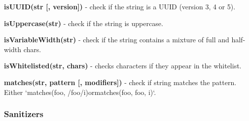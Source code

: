 \begin{DoxyItemize}
\item {\bfseries is\+U\+U\+I\+D(str \mbox{[}, version\mbox{]})} -\/ check if the string is a U\+U\+ID (version 3, 4 or 5).
\item {\bfseries is\+Uppercase(str)} -\/ check if the string is uppercase.
\item {\bfseries is\+Variable\+Width(str)} -\/ check if the string contains a mixture of full and half-\/width chars.
\item {\bfseries is\+Whitelisted(str, chars)} -\/ checks characters if they appear in the whitelist.
\item {\bfseries matches(str, pattern \mbox{[}, modifiers\mbox{]})} -\/ check if string matches the pattern. Either `matches(\textquotesingle{}foo\textquotesingle{}, /foo/i){\ttfamily or}matches(\textquotesingle{}foo\textquotesingle{}, \textquotesingle{}foo\textquotesingle{}, \textquotesingle{}i\textquotesingle{})`.
\end{DoxyItemize}

\subsubsection*{Sanitizers}


